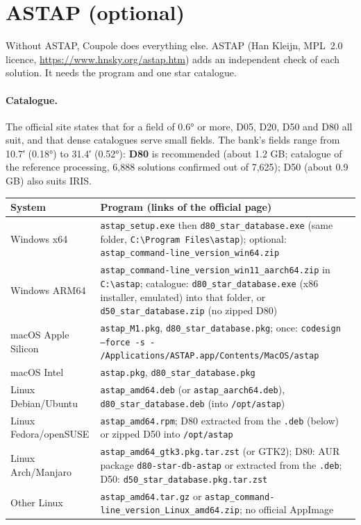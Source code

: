 \section{ASTAP (optional)}
Without ASTAP, Coupole does everything else. ASTAP (Han Kleijn, MPL~2.0 licence,
\url{https://www.hnsky.org/astap.htm}) adds an independent check of each solution. It needs the program and one
star catalogue.


\paragraph{Catalogue.} The official site states that for a field of 0.6° or more, D05, D20, D50 and D80 all suit,
and that dense catalogues serve small fields. The bank's fields range from 10.7′ (0.18°) to 31.4′ (0.52°):
\textbf{D80} is recommended (about 1.2 GB; catalogue of the reference processing, 6,888 solutions confirmed out of
7,625); D50 (about 0.9 GB) also suits IRIS.

\begin{center}\small
\begin{tabularx}{\linewidth}{@{}lX@{}}
\toprule
\textbf{System} & \textbf{Program (links of the official page)}\\
\midrule
Windows x64 & \texttt{astap\_setup.exe} then \texttt{d80\_star\_database.exe} (same folder, \texttt{C:\textbackslash Program Files\textbackslash astap}); optional: \texttt{astap\_command-line\_version\_win64.zip}\\
Windows ARM64 & \texttt{astap\_command-line\_version\_win11\_aarch64.zip} in \texttt{C:\textbackslash astap}; catalogue: \texttt{d80\_star\_database.exe} (x86 installer, emulated) into that folder, or \texttt{d50\_star\_database.zip} (no zipped D80)\\
macOS Apple Silicon & \texttt{astap\_M1.pkg}, \texttt{d80\_star\_database.pkg}; once: \texttt{codesign --force -s - /Applications/ASTAP.app/Contents/MacOS/astap}\\
macOS Intel & \texttt{astap.pkg}, \texttt{d80\_star\_database.pkg}\\
Linux Debian/Ubuntu & \texttt{astap\_amd64.deb} (or \texttt{astap\_aarch64.deb}), \texttt{d80\_star\_database.deb} (into \texttt{/opt/astap})\\
Linux Fedora/openSUSE & \texttt{astap\_amd64.rpm}; D80 extracted from the \texttt{.deb} (below) or zipped D50 into \texttt{/opt/astap}\\
Linux Arch/Manjaro & \texttt{astap\_amd64\_gtk3.pkg.tar.zst} (or GTK2); D80: AUR package \texttt{d80-star-db-astap} or extracted from the \texttt{.deb}; D50: \texttt{d50\_star\_database.pkg.tar.zst}\\
Other Linux & \texttt{astap\_amd64.tar.gz} or \texttt{astap\_command-line\_version\_Linux\_amd64.zip}; no official AppImage\\
\bottomrule
\end{tabularx}
\end{center}

